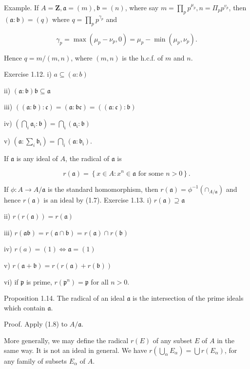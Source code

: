 \documentclass{standalone}
\theoremstyle{definition}
\theoremstyle{remark}
\begin{document}
Example. If $A=\mathbf{Z}, \mathfrak{a}=(m), \mathfrak{b}=(n)$, where say $m=\prod_{p} p^{\mu_{p}}, n=\Pi_{p} p^{v_{p}}$, then $(\mathfrak{a}: \mathfrak{b})=(q)$ where $q=\prod_{p} p^{\gamma_{p}}$ and

\[
\gamma_{p}=\max \left(\mu_{p}-\nu_{p}, 0\right)=\mu_{p}-\min \left(\mu_{p}, \nu_{p}\right) .
\]

Hence $q=m /(m, n)$, where $(m, n)$ is the h.c.f. of $m$ and $n$.

Exercise 1.12. i) $a \subseteq(a: b)$

ii) $(\mathfrak{a}: \mathfrak{b}) \mathfrak{b} \subseteq \mathfrak{a}$

iii) $((\mathfrak{a}: \mathfrak{b}): \mathfrak{c})=(\mathfrak{a}: \mathfrak{b c})=((\mathfrak{a}: \mathfrak{c}): \mathfrak{b})$

iv) $\left(\bigcap_{i} \mathfrak{a}_{i}: \mathfrak{b}\right)=\bigcap_{\mathfrak{i}}\left(\mathfrak{a}_{\mathfrak{i}}: \mathfrak{b}\right)$

v) $\left(\mathfrak{a}: \sum_{i} \mathfrak{b}_{\mathfrak{i}}\right)=\bigcap_{i}\left(\mathfrak{a}: \mathfrak{b}_{\mathfrak{i}}\right)$.

If $\mathfrak{a}$ is any ideal of $A$, the radical of $\mathfrak{a}$ is

\[
r(\mathfrak{a})=\left\{x \in A: x^{n} \in \mathfrak{a} \text { for some } n>0\right\} .
\]

If $\phi: A \rightarrow A / \mathfrak{a}$ is the standard homomorphism, then $r(\mathfrak{a})=\phi^{-1}\left(\mathfrak{\cap}_{A / \mathfrak{a}}\right)$ and hence $r(\mathfrak{a})$ is an ideal by (1.7). Exercise 1.13. i) $r(\mathfrak{a}) \supseteq \mathfrak{a}$

ii) $r(r(\mathfrak{a}))=r(\mathfrak{a})$

iii) $r(\mathfrak{a} \mathfrak{b})=r(\mathfrak{a} \cap \mathfrak{b})=r(\mathfrak{a}) \cap r(\mathfrak{b})$

iv) $r(a)=(1) \Leftrightarrow \mathfrak{a}=(1)$

v) $r(\mathfrak{a}+\mathfrak{b})=r(r(\mathfrak{a})+r(\mathfrak{b}))$

vi) if $\mathfrak{p}$ is prime, $r\left(\mathfrak{p}^{n}\right)=\mathfrak{p}$ for all $n>0$.

Proposition 1.14. The radical of an ideal $\mathfrak{a}$ is the intersection of the prime ideals which contain $\mathfrak{a}$.

Proof. Apply (1.8) to $A / \mathfrak{a}$.

More generally, we may define the radical $r(E)$ of any subset $E$ of $A$ in the same way. It is not an ideal in general. We have $r\left(\bigcup_{\alpha} E_{\alpha}\right)=\bigcup r\left(E_{\alpha}\right)$, for any family of subsets $E_{\alpha}$ of $A$.
\end{document}
